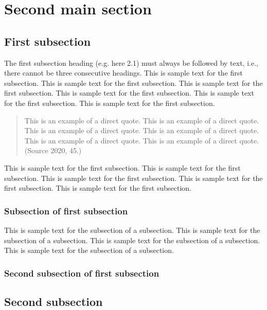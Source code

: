 \chapter{Second main section}

\section{First subsection}

The first subsection heading (e.g. here 2.1) must always be followed by text,
i.e., there cannot be three consecutive headings. This is sample text for the
first subsection. This is sample text for the first subsection. This is sample
text for the first subsection. This is sample text for the first subsection.
This is sample text for the first subsection. This is sample text for the first
subsection.

\begin{quotation}
This is an example of a direct quote. This is an example of a direct quote. This
is an example of a direct quote. This is an example of a direct quote. This is
an example of a direct quote. This is an example of a direct quote. (Source
2020, 45.)
\end{quotation}

This is sample text for the first subsection. This is sample text for the first
subsection. This is sample text for the first subsection. This is sample text
for the first subsection. This is sample text for the first subsection.

\subsection{Subsection of first subsection}

This is sample text for the subsection of a subsection. This is sample text for
the subsection of a subsection. This is sample text for the subsection of a
subsection. This is sample text for the subsection of a subsection.

\subsection{Second subsection of first subsection}

\section{Second subsection}
